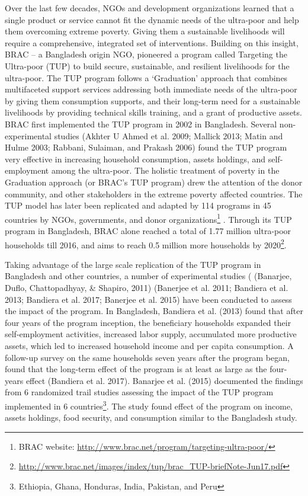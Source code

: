 \documentclass[]{article}
\let\rmarkdownfootnote\footnote%
\def\footnote{\protect\rmarkdownfootnote}
\begin{document}
Over the last few decades, NGOs and development organizations learned
that a single product or service cannot fit the dynamic needs of the
ultra-poor and help them overcoming extreme poverty. Giving them a
sustainable livelihoods will require a comprehensive, integrated set of
interventions. Building on this insight, BRAC -- a Bangladesh origin
NGO, pioneered a program called Targeting the Ultra-poor (TUP) to build
secure, sustainable, and resilient livelihoods for the ultra-poor. The
TUP program follows a `Graduation' approach that combines multifaceted
support services addressing both immediate needs of the ultra-poor by
giving them consumption supports, and their long-term need for a
sustainable livelihoods by providing technical skills training, and a
grant of productive assets. BRAC first implemented the TUP program in
2002 in Bangladesh. Several non-experimental studies (Akhter U Ahmed et
al. 2009; Mallick 2013; Matin and Hulme 2003; Rabbani, Sulaiman, and
Prakash 2006) found the TUP program very effective in increasing
household consumption, assets holdings, and self-employment among the
ultra-poor. The holistic treatment of poverty in the Graduation approach
(or BRAC's TUP program) drew the attention of the donor community, and
other stakeholders in the extreme poverty affected countries. The TUP
model has later been replicated and adapted by 114 programs in 45
countries by NGOs, governments, and donor organizations\footnote{BRAC
  website: \url{http://www.brac.net/program/targeting-ultra-poor/}} .
Through its TUP program in Bangladesh, BRAC alone reached a total of
1.77 million ultra-poor households till 2016, and aims to reach 0.5
million more households by 2020\footnote{\url{http://www.brac.net/images/index/tup/brac_TUP-briefNote-Jun17.pdf}}.

Taking advantage of the large scale replication of the TUP program in
Bangladesh and other countries, a number of experimental studies (
(Banarjee, Duflo, Chattopadhyay, \& Shapiro, 2011) (Banerjee et al.
2011; Bandiera et al. 2013; Bandiera et al. 2017; Banerjee et al. 2015)
have been conducted to assess the impact of the program. In Bangladesh,
Bandiera et al. (2013) found that after four years of the program
inception, the beneficiary households expanded their self-employment
activities, increased labor supply, accumulated more productive assets,
which led to increased household income and per capita consumption. A
follow-up survey on the same households seven years after the program
began, found that the long-term effect of the program is at least as
large as the four-years effect (Bandiera et al. 2017). Banarjee et al.
(2015) documented the findings from 6 randomized trail studies assessing
the impact of the TUP program implemented in 6 countries\footnote{Ethiopia,
  Ghana, Honduras, India, Pakistan, and Peru}. The study found effect of
the program on income, assets holdings, food security, and consumption
similar to the Bangladesh study.
\end{document}
